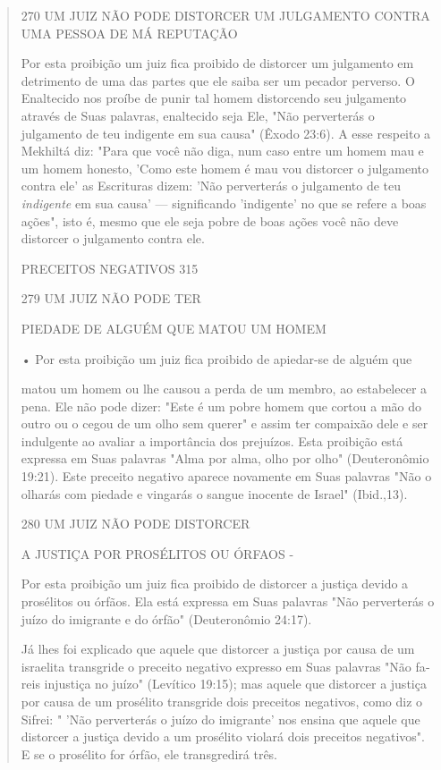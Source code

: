 \begin{quote}
270 UM JUIZ NÃO PODE DISTORCER UM JULGAMENTO CONTRA UMA PESSOA DE MÁ
REPUTAÇÃO

Por esta proibição um juiz fica proibido de distorcer um julgamento em
detrimento de uma das partes que ele saiba ser um pecador perverso. O
Enaltecido nos proíbe de punir tal homem distorcendo seu julgamento
através de Suas palavras, enaltecido seja Ele, "Não perverterás o
julgamento de teu in­digente em sua causa" (Êxodo 23:6). A esse respeito
a Mekhiltá diz: "Para que você não diga, num caso entre um homem mau e
um homem honesto, 'Como este homem é mau vou distorcer o julgamento
contra ele' as Escrituras dizem: 'Não perverterás o julgamento de teu
\emph{indigente} em sua causa' --- significando 'indigente' no que se
refere a boas ações", isto é, mesmo que ele seja pobre de boas ações
você não deve distorcer o julgamento contra ele.

PRECEITOS NEGATIVOS 315

279 UM JUIZ NÃO PODE TER

PIEDADE DE ALGUÉM QUE MATOU UM HOMEM

• Por esta proibição um juiz fica proibido de apiedar-se de alguém que

matou um homem ou lhe causou a perda de um membro, ao estabelecer a
pe­na. Ele não pode dizer: "Este é um pobre homem que cortou a mão do
outro ou o cegou de um olho sem querer" e assim ter compaixão dele e ser
indulgen­te ao avaliar a importância dos prejuízos. Esta proibição está
expressa em Suas palavras "Alma por alma, olho por olho" (Deuteronômio
19:21). Este preceito negativo aparece novamente em Suas palavras "Não o
olharás com piedade e vingarás o sangue inocente de Israel" (Ibid.,13).

280 UM JUIZ NÃO PODE DISTORCER

A JUSTIÇA POR PROSÉLITOS OU ÓRFAOS -

Por esta proibição um juiz fica proibido de distorcer a justiça devi­do
a prosélitos ou órfãos. Ela está expressa em Suas palavras "Não
perverterás o juízo do imigrante e do órfão" (Deuteronômio 24:17).

Já lhes foi explicado que aquele que distorcer a justiça por causa de um
israelita transgride o preceito negativo expresso em Suas palavras "Não
fa­reis injustiça no juízo" (Levítico 19:15); mas aquele que distorcer a
justiça por causa de um prosélito transgride dois preceitos negativos,
como diz o Sifrei: " 'Não perverterás o juízo do imigrante' nos ensina
que aquele que distorcer a justiça devido a um prosélito violará dois
preceitos negativos". E se o proséli­to for órfão, ele transgredirá
três.


\end{quote}
